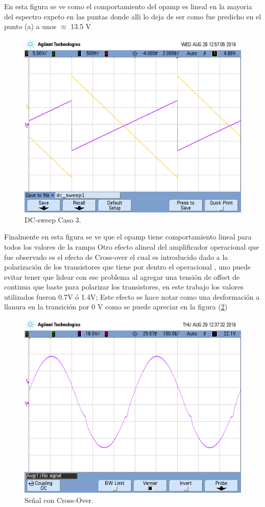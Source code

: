 En esta figura se ve como el comportamiento del opamp es lineal en la mayoria del espectro expeto en las puntas donde alli lo deja de ser como fue predicho en el punto (a) a unos $\approx$ 13.5 V
\begin{figure}[H]	
	\centering
	\includegraphics[width=\textwidth]{Ejercicio1/Imagenes/dc_sweep_c3.png}
	\caption{DC-sweep Caso 3.}
	\label{fig:dcc3}
\end{figure} 
Finalmente en esta figura se ve que el opamp tiene comportamiento lineal para todos los valores de la rampa
Otro efecto alineal del amplificador operacional que fue observado es el efecto de Cross-over el cual es introducido dado a la polarización de los transistores que tiene por dentro el operacional , uno puede evitar tener que lidear con ese problema al agregar una tensión de offset de continua que baste para polarizar los transistores, en este trabajo los valores utilizados fueron 0.7V ó 1.4V; Este efecto se hace notar como una desformación a llanura en la transición por 0 V como  se puede apreciar en la figura (\ref{fig:co})
\begin{figure}[H]	
	\centering
	\includegraphics[width=\textwidth]{Ejercicio1/Imagenes/CrossOver.png}
	\caption{Señal con Cross-Over.}
	\label{fig:co}
\end{figure} 

